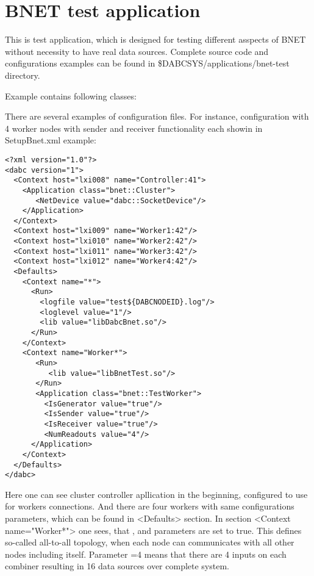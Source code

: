\section{BNET test application}

This is test application, which is designed for testing different asspects of BNET
without necessity to have real data sources. Complete source code and configurations 
examples can be found in \$DABCSYS/applications/bnet-test directory.  

Example contains following classes:
\bbul
\item  {}
\item  {}
\item  {}
\item  {}
\item  {}
\item  {}
\ebul

There are several examples of configuration files. For instance,
configuration with 4 worker nodes with sender and receiver functionality each
showin in SetupBnet.xml example:

\begin{small}
\begin{verbatim}
<?xml version="1.0"?>
<dabc version="1">
  <Context host="lxi008" name="Controller:41">
    <Application class="bnet::Cluster">
       <NetDevice value="dabc::SocketDevice"/>
    </Application>
  </Context>
  <Context host="lxi009" name="Worker1:42"/>
  <Context host="lxi010" name="Worker2:42"/>
  <Context host="lxi011" name="Worker3:42"/>
  <Context host="lxi012" name="Worker4:42"/>
  <Defaults>
    <Context name="*">
      <Run>
        <logfile value="test${DABCNODEID}.log"/>
        <loglevel value="1"/>
        <lib value="libDabcBnet.so"/>
      </Run>
    </Context>
    <Context name="Worker*">
       <Run>
          <lib value="libBnetTest.so"/>
       </Run>
       <Application class="bnet::TestWorker">
         <IsGenerator value="true"/>
         <IsSender value="true"/>
         <IsReceiver value="true"/>
         <NumReadouts value="4"/>
      </Application>       
    </Context>
  </Defaults>
</dabc>
\end{verbatim}
\end{small}

Here one can see cluster controller apllication in the beginning, configured to
use  for workers connections. And there are four workers
with same configurations parameters, which can be found in <Defaults> section.
In section <Context name="Worker*"> one sees, 
that ,  and  parameters are set to true.
This defines so-called all-to-all topology, when each node can communicates with all other nodes including itself.   
Parameter =4 means that there are 4 inputs on each combiner resulting 
in 16 data sources over complete system.

